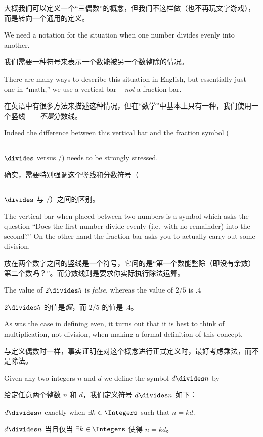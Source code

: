 大概我们可以定义一个“三偶数”的概念，但我们不这样做（也不再玩文字游戏），而是转向一个通用的定义。

We need a notation for the
situation when one number divides evenly into another.

我们需要一种符号来表示一个数能被另一个数整除的情况。

There are
many ways to describe this situation in English, but essentially 
just one in ``math,''  we use a vertical bar -- {\em not} a fraction
bar.

在英语中有很多方法来描述这种情况，但在“数学”中基本上只有一种，我们使用一个竖线——{\em 不是}分数线。

Indeed the difference between this vertical bar and the 
fraction symbol (\rule{3pt}{0pt}$\divides$ versus $/$) needs to 
be strongly stressed.

确实，需要特别强调这个竖线和分数符号（\rule{3pt}{0pt}$\divides$ 与 $/$）之间的区别。

The vertical bar
when placed between two numbers is a symbol which asks the question 
``Does the first number divide evenly (i.e.\ with no remainder) into 
the second?''  On the other hand the fraction bar asks you to actually
carry out some division.

放在两个数字之间的竖线是一个符号，它问的是“第一个数能整除（即没有余数）第二个数吗？”。而分数线则是要求你实际执行除法运算。

The value of $2\divides 5$ is {\em false}, whereas
the value of $2/5$ is $.4$

$2\divides 5$ 的值是{\em 假}，而 $2/5$ 的值是 $.4$。

As was the case in defining even, it turns out that it is best
to think of multiplication, not division, when making a formal
definition of this concept.

与定义偶数时一样，事实证明在对这个概念进行正式定义时，最好考虑乘法，而不是除法。

Given any two integers $n$ and $d$
we define the symbol $d\divides n$ by

给定任意两个整数 $n$ 和 $d$，我们定义符号 $d\divides n$ 如下：

\begin{defi}
$ d \divides n$ exactly when $\exists k \in \Integers$ such that $n = kd$.
\end{defi}

\begin{defi}
$ d \divides n$ 当且仅当 $\exists k \in \Integers$ 使得 $n = kd$。
\end{defi}

